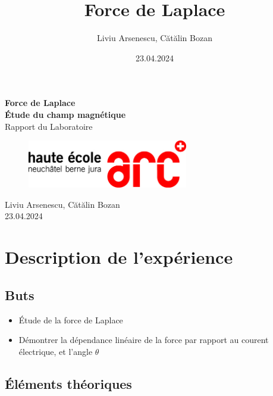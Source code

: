 \documentclass[12pt,a4paper]{article}
\title{Force de Laplace}
\author{Liviu Arsenescu, Cătălin Bozan}
\date{23.04.2024}
\begin{document}
    \begin{titlepage}
        \begin{center}
            \vspace*{\fill}
            \Huge \textbf{Force de Laplace} \\
            \Huge \textbf{Étude du champ magnétique} \\
            \Large Rapport du Laboratoire \\
            \begin{figure}[h]
                \centering
                \includegraphics[width=7cm]{hearclogo.png}
            \end{figure}
            \vspace{\fill}
            \Large Liviu Arsenescu, Cătălin Bozan \\
            23.04.2024

            \vspace*{\fill}
        \end{center}
    \end{titlepage}

    \thispagestyle{empty}
    \tableofcontents
    \newpage

    \section{Description de l'expérience}
    \subsection{Buts}
    \begin{itemize}
        \item Étude de la force de Laplace
        \item Démontrer la dépendance linéaire de la force par rapport au courent électrique, et l'angle $\theta$
    \end{itemize}

    \subsection{Éléments théoriques}
\end{document}
